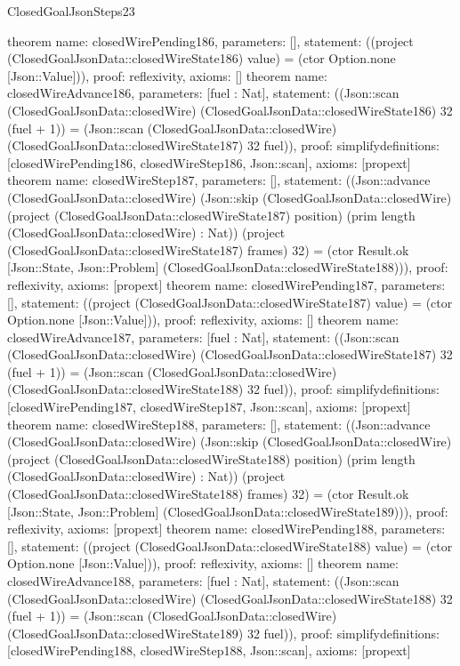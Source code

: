 \begin{lexlean}{ClosedGoalJsonSteps23}
\begin{semanticmodule}
{}
theorem{
 name: closedWirePending186, parameters: [],
 statement: ((project (ClosedGoalJsonData::closedWireState186) value) = (ctor Option.none [Json::Value])), proof: reflexivity{}, axioms: []
}
theorem{
 name: closedWireAdvance186, parameters: [fuel : Nat],
 statement: ((Json::scan (ClosedGoalJsonData::closedWire) (ClosedGoalJsonData::closedWireState186) 32 (fuel + 1)) = (Json::scan (ClosedGoalJsonData::closedWire) (ClosedGoalJsonData::closedWireState187) 32 fuel)), proof: simplify{definitions: [closedWirePending186, closedWireStep186, Json::scan]}, axioms: [propext]
}
theorem{
 name: closedWireStep187, parameters: [],
 statement: ((Json::advance (ClosedGoalJsonData::closedWire) (Json::skip (ClosedGoalJsonData::closedWire) (project (ClosedGoalJsonData::closedWireState187) position) (prim length (ClosedGoalJsonData::closedWire) : Nat)) (project (ClosedGoalJsonData::closedWireState187) frames) 32) = (ctor Result.ok [Json::State, Json::Problem] (ClosedGoalJsonData::closedWireState188))), proof: reflexivity{}, axioms: [propext]
}
theorem{
 name: closedWirePending187, parameters: [],
 statement: ((project (ClosedGoalJsonData::closedWireState187) value) = (ctor Option.none [Json::Value])), proof: reflexivity{}, axioms: []
}
theorem{
 name: closedWireAdvance187, parameters: [fuel : Nat],
 statement: ((Json::scan (ClosedGoalJsonData::closedWire) (ClosedGoalJsonData::closedWireState187) 32 (fuel + 1)) = (Json::scan (ClosedGoalJsonData::closedWire) (ClosedGoalJsonData::closedWireState188) 32 fuel)), proof: simplify{definitions: [closedWirePending187, closedWireStep187, Json::scan]}, axioms: [propext]
}
theorem{
 name: closedWireStep188, parameters: [],
 statement: ((Json::advance (ClosedGoalJsonData::closedWire) (Json::skip (ClosedGoalJsonData::closedWire) (project (ClosedGoalJsonData::closedWireState188) position) (prim length (ClosedGoalJsonData::closedWire) : Nat)) (project (ClosedGoalJsonData::closedWireState188) frames) 32) = (ctor Result.ok [Json::State, Json::Problem] (ClosedGoalJsonData::closedWireState189))), proof: reflexivity{}, axioms: [propext]
}
theorem{
 name: closedWirePending188, parameters: [],
 statement: ((project (ClosedGoalJsonData::closedWireState188) value) = (ctor Option.none [Json::Value])), proof: reflexivity{}, axioms: []
}
theorem{
 name: closedWireAdvance188, parameters: [fuel : Nat],
 statement: ((Json::scan (ClosedGoalJsonData::closedWire) (ClosedGoalJsonData::closedWireState188) 32 (fuel + 1)) = (Json::scan (ClosedGoalJsonData::closedWire) (ClosedGoalJsonData::closedWireState189) 32 fuel)), proof: simplify{definitions: [closedWirePending188, closedWireStep188, Json::scan]}, axioms: [propext]
}
\end{semanticmodule}
\end{lexlean}
